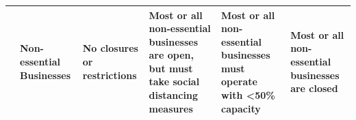 \begin{landscape}
\begin{longtable}{| C{2cm} |  C{2cm} |C{3cm} |C{3cm} |C{3cm} |C{3cm}|}
& \textbf{Non-essential Businesses} & No closures or restrictions & Most or all non-essential businesses are open, but must take social distancing measures & Most or all non-essential businesses must operate with <50\% capacity & Most or all non-essential businesses are closed \\ \bottomrule



\end{longtable}
\end{landscape}



%
% 
% 
%
